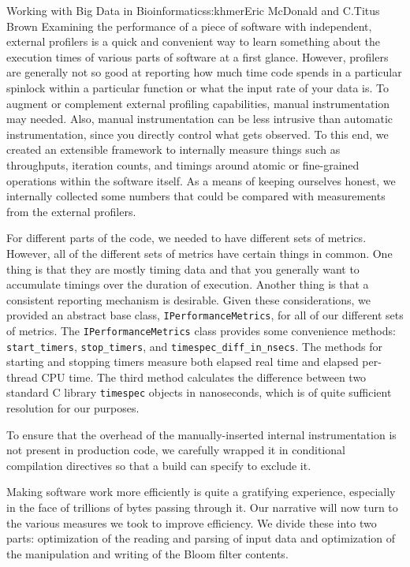 \begin{aosachapter}{Working with Big Data in Bioinformatics}{s:khmer}{Eric McDonald and C.\/Titus Brown}
Examining the performance of a piece of software with independent,
external profilers is a quick and convenient way to learn something
about the execution times of various parts of software at a first
glance. However, profilers are generally not so good at reporting how
much time code spends in a particular spinlock within a particular
function or what the input rate of your data is. To augment or
complement external profiling capabilities, manual instrumentation may
needed. Also, manual instrumentation can be less intrusive than
automatic instrumentation, since you directly control what gets
observed. To this end, we created an extensible framework to internally
measure things such as throughputs, iteration counts, and timings around
atomic or fine-grained operations within the software itself. As a means
of keeping ourselves honest, we internally collected some numbers that
could be compared with measurements from the external profilers.

For different parts of the code, we needed to have different sets of
metrics. However, all of the different sets of metrics have certain
things in common. One thing is that they are mostly timing data and that
you generally want to accumulate timings over the duration of execution.
Another thing is that a consistent reporting mechanism is desirable.
Given these considerations, we provided an abstract base class,
\texttt{IPerformanceMetrics}, for all of our different sets of metrics.
The \texttt{IPerformanceMetrics} class provides some convenience
methods: \texttt{start\_timers}, \texttt{stop\_timers}, and
\texttt{timespec\_diff\_in\_nsecs}. The methods for starting and
stopping timers measure both elapsed real time and elapsed per-thread
CPU time. The third method calculates the difference between two
standard C library \texttt{timespec} objects in nanoseconds, which is of
quite sufficient resolution for our purposes.

To ensure that the overhead of the manually-inserted internal
instrumentation is not present in production code, we carefully wrapped
it in conditional compilation directives so that a build can specify to
exclude it.


Making software work more efficiently is quite a gratifying experience,
especially in the face of trillions of bytes passing through it. Our
narrative will now turn to the various measures we took to improve
efficiency. We divide these into two parts: optimization of the reading
and parsing of input data and optimization of the manipulation and
writing of the Bloom filter contents.


\end{aosachapter}
